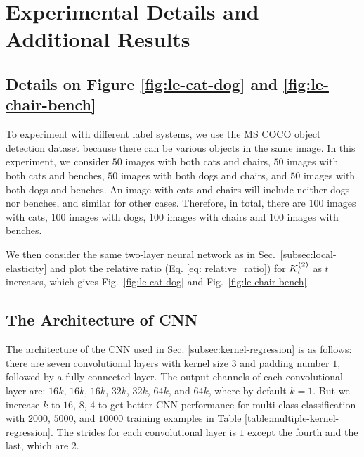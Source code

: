\section{Experimental Details and Additional Results}
\label{sec:experimental-details}
\subsection{Details on Figure \ref{fig:le-cat-dog} and \ref{fig:le-chair-bench}}
\label{subsec:different-labeling-systems}
To experiment with different label systems, we use the MS COCO object detection dataset \citep{lin2014microsoft} because there can be various objects in the same image. In this experiment, we consider $50$ images with both cats and chairs, $50$ images with both cats and benches, $50$ images with both dogs and chairs, and $50$ images with both dogs and benches. An image with cats and chairs will include neither dogs nor benches, and similar for other cases. Therefore, in total, there are $100$ images with cats, $100$ images with dogs, $100$ images with chairs and $100$ images with benches. 

We then consider the same two-layer neural network as in Sec.~\ref{subsec:local-elasticity} and plot the relative ratio (Eq. \eqref{eq: relative_ratio}) for ${K}^{(2)}_t$ as $t$ increases, which gives Fig.~\ref{fig:le-cat-dog} and Fig.~\ref{fig:le-chair-bench}.



\subsection{The Architecture of CNN}
\label{subsec:CNN-architecture}
The architecture of the CNN used in Sec. \ref{subsec:kernel-regression} is as follows: there are seven convolutional layers with kernel size $3$ and padding number $1$, followed by a fully-connected layer. The output channels of each convolutional layer are: $16k$, $16k$, $16k$, $32k$, $32k$, $64k$, and $64k$, where by default $k=1$. But we increase $k$ to $16$, $8$, $4$ to get better CNN performance for multi-class classification with $2000$, $5000$, and $10000$ training examples in Table \ref{table:multiple-kernel-regression}. The strides for each convolutional layer is $1$ except the fourth and the last, which are $2$. 


